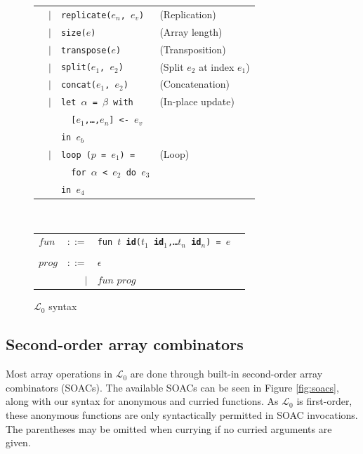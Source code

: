 \documentclass{sigplanconf}  %
\newcommand{\LO}{$\mathcal{L}_0$}
\begin{document}
\begin{figure}[bt]
\begin{tabular}{lrll}
& $|$ & {\tt replicate($e_{n}$, $e_{v}$)} & (Replication) \\
& $|$ & {\tt size($e$)} & (Array length) \\
& $|$ & {\tt transpose($e$)} & (Transposition) \\
& $|$ & {\tt split($e_{1}$, $e_{2}$)} & (Split $e_{2}$ at index $e_{1}$) \\
& $|$ & {\tt concat($e_{1}$, $e_{2}$)} & (Concatenation) \\
& $|$ & {\tt let $\alpha$ = $\beta$ with} & (In-place update) \\
&     & {\tt \ \ [$e_{1}$,\ldots,$e_{n}$] <- $e_{v}$} \\
&     & {\tt in $e_{b}$} \\
& $|$ & {\tt loop ($p$ = $e_{1}$) =} & (Loop) \\
&     & {\tt \ \ for $\alpha$ < $e_{2}$ do $e_{3}$} \\
&     & {\tt in $e_{4}$} \\
\end{tabular}
\\
\begin{tabular}{lrll}
$fun$ & $::=$ & {\tt fun $t$ {\bf id}($t_{1}$ {\bf id}$_{1}$,\ldots $t_{n}$ {\bf id}$_{n}$) = $e$} \\
\\
$prog$ & $::=$ & $\epsilon$ \\
       & $|$   & $fun$ $prog$
\end{tabular}
\caption{\LO{} syntax}
\label{fig:fo-syntax}
\end{figure}

\subsection{Second-order array combinators}
\label{sec:soacs}

Most array operations in \LO{} are done through built-in second-order
array combinators (SOACs).  The available SOACs can be seen in Figure
\ref{fig:soacs}, along with our syntax for anonymous and curried
functions.  As \LO{} is first-order, these anonymous functions are
only syntactically permitted in SOAC invocations.  The parentheses may
be omitted when currying if no curried arguments are given.
\end{document}
